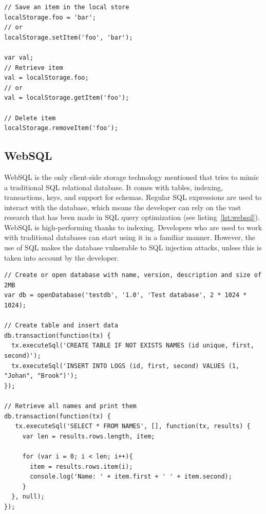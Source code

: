 \begin{Code}
\begin{lstlisting}[caption={Use of Web Storage}, label={lst:localStorage}]
// Save an item in the local store
localStorage.foo = 'bar';
// or
localStorage.setItem('foo', 'bar');

var val;
// Retrieve item
val = localStorage.foo;
// or
val = localStorage.getItem('foo');

// Delete item
localStorage.removeItem('foo');
\end{lstlisting}
\end{Code}

\subsection{WebSQL}
\label{sec:websql}
WebSQL is the only client-side storage technology mentioned that tries to mimic a traditional SQL relational database. It comes with tables, indexing, transactions, keys, and support for schemas. Regular SQL expressions are used to interact with the database, which means the developer can rely on the vast research that has been made in SQL query optimization (see listing~\ref{lst:websql}). WebSQL is high-performing thanks to indexing. Developers who are used to work with traditional databases can start using it in a familiar manner. However, the use of SQL makes the database vulnerable to SQL injection attacks, unless this is taken into account by the developer.

\begin{Code}
\begin{lstlisting}[caption={Use of WebSQL}, label={lst:websql}]
// Create or open database with name, version, description and size of 2MB
var db = openDatabase('testdb', '1.0', 'Test database', 2 * 1024 * 1024);

// Create table and insert data
db.transaction(function(tx) {
  tx.executeSql('CREATE TABLE IF NOT EXISTS NAMES (id unique, first, second)');
  tx.executeSql('INSERT INTO LOGS (id, first, second) VALUES (1, "Johan", "Brook")');
});

// Retrieve all names and print them
db.transaction(function(tx) {
   tx.executeSql('SELECT * FROM NAMES', [], function(tx, results) {
     var len = results.rows.length, item;

     for (var i = 0; i < len; i++){
       item = results.rows.item(i);
       console.log('Name: ' + item.first + ' ' + item.second);
     }
  }, null);
});
\end{lstlisting}
\end{Code}

